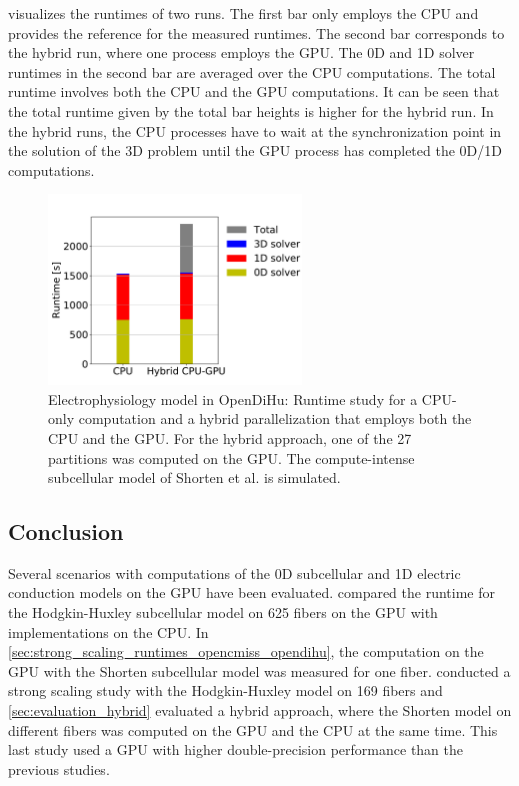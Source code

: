  visualizes the runtimes of two runs. The first bar only employs the CPU and provides the reference for the measured runtimes. The second bar corresponds to the hybrid run, where one process employs the GPU. The 0D and 1D solver runtimes in the second bar are averaged over the CPU computations. The total runtime involves both the CPU and the GPU computations.
It can be seen that the total runtime given by the total bar heights is higher for the hybrid run. In the hybrid runs, the CPU processes have to wait at the synchronization point in the solution of the 3D problem until the GPU process has completed the 0D/1D computations.

\begin{figure}
  \centering%
  \includegraphics[width=0.6\textwidth]{images/results/studies/17_shorten_gpu.pdf}%
  \caption{Electrophysiology model in OpenDiHu: Runtime study for a CPU-only computation and a hybrid parallelization that employs both the CPU and the GPU. For the hybrid approach, one of the 27 partitions was computed on the GPU. The compute-intense subcellular model of Shorten et al. is simulated.}%
  \label{fig:17_shorten_gpu}%
\end{figure}

\subsection{Conclusion}

Several scenarios with computations of the 0D subcellular and 1D electric conduction models on the GPU have been evaluated. 
 compared the runtime for the Hodgkin-Huxley subcellular model on 625 fibers on the GPU with implementations on the CPU.
In \cref{sec:strong_scaling_runtimes_opencmiss_opendihu}, the computation on the GPU with the Shorten subcellular model was measured for one fiber.
 conducted a strong scaling study with the Hodgkin-Huxley model on 169 fibers and \cref{sec:evaluation_hybrid} evaluated a hybrid approach, where the Shorten model on different fibers was computed on the GPU and the CPU at the same time. This last study used a GPU with higher double-precision performance than the previous studies.

